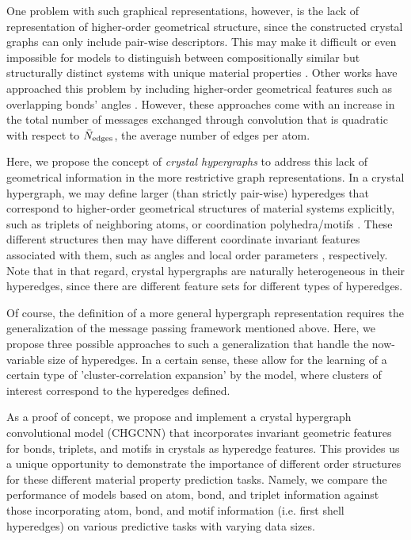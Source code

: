 \documentclass[10pt,a4paper,twocolumn]{article}
\begin{document}
One problem with such graphical representations, however, is the lack of representation of higher-order geometrical structure, since the constructed crystal graphs can only include pair-wise descriptors. This may make it difficult or even impossible for models to distinguish between compositionally similar but structurally distinct systems with unique material properties \cite{congn}. Other works have approached this problem by including higher-order geometrical features such as overlapping bonds' angles \cite{alignn,m3gnet,congn}. However, these approaches come with an increase in the total number of messages exchanged through convolution that is quadratic with respect to $\Bar{N}_{\text{edges}}$, the average number of edges per atom.

Here, we propose the concept of \textit{crystal hypergraphs} to address this lack of geometrical information in the more restrictive graph representations. In a crystal hypergraph, we may define larger (than strictly pair-wise) hyperedges that correspond to higher-order geometrical structures of material systems explicitly, such as triplets of neighboring atoms, or coordination polyhedra/motifs \cite{paulings_rules, coordpolyshapes, motifstats, motifexplore, clustermotifsanal, motife3nn}. These different structures then may have different coordinate invariant features associated with them, such as angles and local order parameters \cite{orderparam1, orderparam2, molorderparam}, respectively. Note that in that regard, crystal hypergraphs are naturally heterogeneous in their hyperedges, since there are different feature sets for different types of hyperedges.

Of course, the definition of a more general hypergraph representation requires the generalization of the message passing framework mentioned above. Here, we propose three possible approaches to such a generalization that handle the now-variable size of hyperedges. In a certain sense, these allow for the learning of a certain type of 'cluster-correlation expansion' \cite{clease, cce_crys, cce_gen} by the model, where clusters of interest correspond to the hyperedges defined.

As a proof of concept, we propose and implement a crystal hypergraph convolutional model (CHGCNN) that incorporates invariant geometric features for bonds, triplets, and motifs in crystals as hyperedge features. This provides us a unique opportunity to demonstrate the importance of different order structures for these different material property prediction tasks. Namely, we compare the performance of models based on atom, bond, and triplet information against those incorporating atom, bond, and motif information (i.e. first shell hyperedges) on various predictive tasks with varying data sizes.
\end{document}
